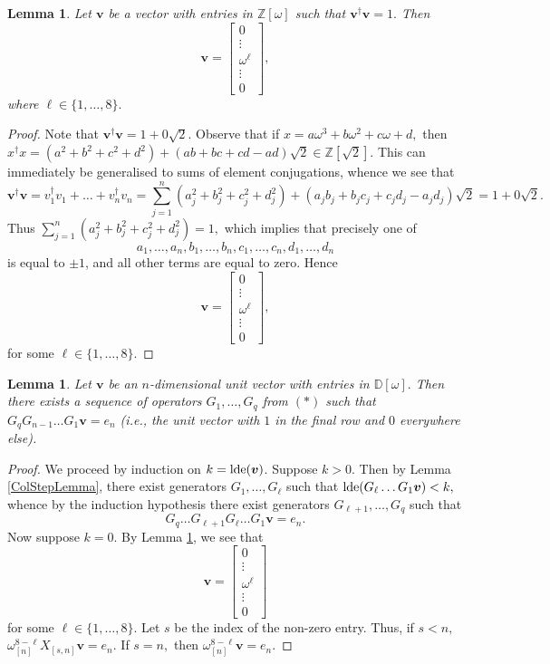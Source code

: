 \documentclass{dalthesis}
\theoremstyle{theorem}
\newtheorem{lemma}[theorem]{Lemma}
\theoremstyle{definition}
\theoremstyle{definition}  %
\theoremstyle{definition}
\newcommand{\Z}{\mathbb{Z}}
\newcommand{\D}{\mathbb{D}}
\renewcommand{\:}{\mathbin{:}}
\newcommand{\lde}{\mathop{\rm lde}\nolimits}
\begin{document}
\begin{lemma}
\label{SingleEntryLemma}
Let $\boldsymbol{v}$ be a vector with entries in $\Z[\omega]$ such that $\boldsymbol{v}^{\dagger}\boldsymbol{v} = 1.$ Then\[
\boldsymbol{v} = \left[\begin{array}{c}
0\\
\vdots\\
\omega^\ell\\
\vdots\\
0
\end{array} \right],
\]
where $\ell\in\{1,\ldots,8\}.$
\end{lemma}
\begin{proof}
Note that $\boldsymbol{v}^\dagger\boldsymbol{v} = 1 + 0\sqrt{2}.$ Observe that if $x = a\omega^3+b\omega^2+c\omega+d,$ then $x^\dagger x = (a^2+b^2+c^2+d^2)+(ab + bc + cd - ad)\sqrt{2}\in\Z[\sqrt{2}].$ This can immediately be generalised to sums of element conjugations, whence we see that \[
\boldsymbol{v}^\dagger\boldsymbol{v} = v^\dagger_1v_1+\ldots+v^\dagger_nv_n = \sum^n_{j=1}(a_j^2+b_j^2+c_j^2 + d_j^2) + (a_jb_j+b_jc_j+c_jd_j-a_jd_j)\sqrt{2} = 1 + 0\sqrt{2}.
\]
Thus $\sum^n_{j=1}(a_j^2+b_j^2+c_j^2+d_j^2) = 1,$ which implies that precisely one of
\[a_1,\ldots, a_n,b_1,\ldots,b_n,c_1,\ldots,c_n,d_1,\ldots,d_n\] is equal to $\pm 1$, and all other terms are equal to zero. Hence \[
\boldsymbol{v} = \left[\begin{array}{c}
0\\
\vdots\\
\omega^\ell\\
\vdots\\
0
\end{array}\right],
\]for some $\ell\in\{1,\ldots,8\}.$
\end{proof}
\begin{lemma}
\label{ColumnLemma}
Let $\boldsymbol{v}$ be an $n$-dimensional unit vector with entries in $\D[\omega].$ Then there exists a sequence of operators $G_1,\ldots,G_q$ from $(*)$ such that $G_q G_{n-1}\ldots G_1\boldsymbol{v} = e_n$ (i.e., the unit vector with $1$ in the final row and $0$ everywhere else).
\end{lemma}
\begin{proof}
We proceed by induction on $k = \lde(\boldsymbol{v})$. Suppose $k > 0.$ Then by Lemma \ref{ColStepLemma}, there exist generators $G_1,\ldots,G_\ell$ such that $\lde(G_\ell\ldots G_1\boldsymbol{v}) < k,$ whence by the induction hypothesis there exist generators $G_{\ell+1},\ldots,G_q$ such that \[G_q\ldots G_{\ell+1}G_\ell\ldots G_1\boldsymbol{v} = e_n.\]
Now suppose $k = 0.$ By Lemma \ref{SingleEntryLemma}, we see that 
\[ \boldsymbol{v} = \left[\begin{array}{c}
0\\
\vdots\\
\omega^\ell\\
\vdots\\
0
\end{array}\right]
\]
for some $\ell\in\{1,\ldots ,8\}.$  Let $s$ be the index of the non-zero entry. Thus, if $s < n,$ $\omega^{8-\ell}_{[n]}X_{[s,n]}\boldsymbol{v} = e_n.$ If $s = n,$ then $\omega^{8-\ell}_{[n]}\boldsymbol{v} = e_n.$
\end{proof}
\end{document}
